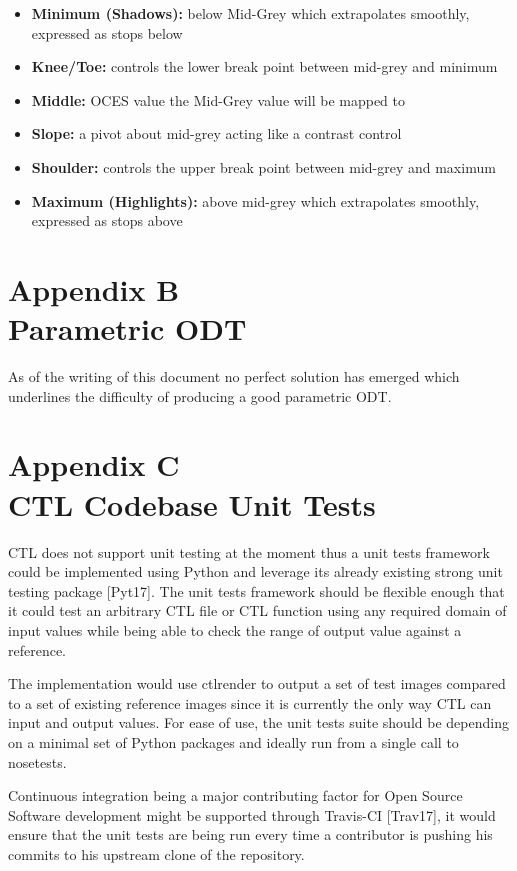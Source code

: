 \documentclass[conference]{IEEEtran}
\begin{document}
\begin{itemize}
\item \textbf{Minimum (Shadows):} below Mid-Grey which extrapolates smoothly, expressed as stops below
\item \textbf{Knee/Toe:} controls the lower break point between mid-grey and minimum
\item \textbf{Middle:} OCES value the Mid-Grey value will be mapped to
\item \textbf{Slope:} a pivot about mid-grey acting like a contrast control
\item \textbf{Shoulder:} controls the upper break point between mid-grey and maximum
\item \textbf{Maximum (Highlights):} above mid-grey which extrapolates smoothly, expressed as stops above
\end{itemize}

\section*{Appendix B\\ \small Parametric ODT}
As of the writing of this document no perfect solution has emerged which underlines the difficulty of producing a good parametric ODT.

\section*{Appendix C\\ \small CTL Codebase Unit Tests}
CTL does not support unit testing at the moment thus a unit tests framework could be implemented using Python and leverage its already existing strong unit testing package [Pyt17]. The unit tests framework should be flexible enough that it could test an arbitrary CTL file or CTL function using any required domain of input values while being able to check the range of output value against a reference.

The implementation would use ctlrender to output a set of test images compared to a set of existing reference images since it is currently the only way CTL can input and output values. For ease of use, the unit tests suite should be depending on a minimal set of Python packages and ideally run from a single call to nosetests.

Continuous integration being a major contributing factor for Open Source Software development might be supported through Travis-CI [Trav17], it would ensure that the unit tests are being run every time a contributor is pushing his commits to his upstream clone of the repository.
\end{document}

